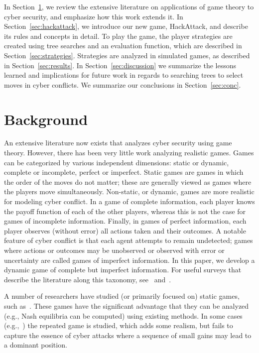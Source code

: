 \documentclass{sig-alternate-05-2015}
\begin{document}
In Section~\ref{sec:background}, we review the extensive literature on applications of game theory to cyber security, and emphasize how this work extends it. In Section~\ref{sec:hackattack}, we introduce our new game, HackAttack, and describe its rules and concepts in detail. To play the game, the player strategies are created using tree searches and an evaluation function, which are described in Section~\ref{sec:strategies}. Strategies are analyzed in simulated games, as described in Section~\ref{sec:results}. In Section~\ref{sec:discussion} we summarize the lessons learned and implications for future work in regards to searching trees to select moves in cyber conflicts. We summarize our conclusions in Section~\ref{sec:conc}.


\section{Background}
\label{sec:background}
An extensive literature now exists that analyzes cyber security using
game theory. However, there has been very little work analyzing realistic
games. Games can be categorized by various independent dimensions:
static or dynamic, complete or incomplete, perfect
or imperfect. Static games are games in which the order of the moves
do not matter; these are generally viewed as games where the players
move simultaneously. Non-static, or dynamic, games are more realistic
for modeling cyber conflict. In a game of complete information, each
player knows the payoff function of each of the other players, whereas
this is not the case for games of incomplete information. Finally, in
games of perfect information, each player observes (without error) all
actions taken and their outcomes. A notable feature of cyber conflict
is that each agent attempts to remain undetected; games where actions
or outcomes may be unobserved or observed with error or uncertainty
are called games of imperfect information. In this paper, we develop a
dynamic game of complete but imperfect information. For useful surveys
that describe the literature along this taxonomy,
see~\cite{liang2013game} and~\cite{roy2010survey}.


A number of researchers have studied (or primarily focused on) static
games, such as~\cite{chen2009game,grossklags2009uncertainty,he2012game,liu2006bayesian}. These
games have the significant advantage that they can be analyzed (e.g.,
Nash equilibria can be computed) using existing methods. In some cases
(e.g.,~\cite{nguyen2009security}) the repeated game is studied, which
adds some realism, but fails to capture the essence of cyber attacks
where a sequence of small gains may lead to a dominant position.
\end{document}
